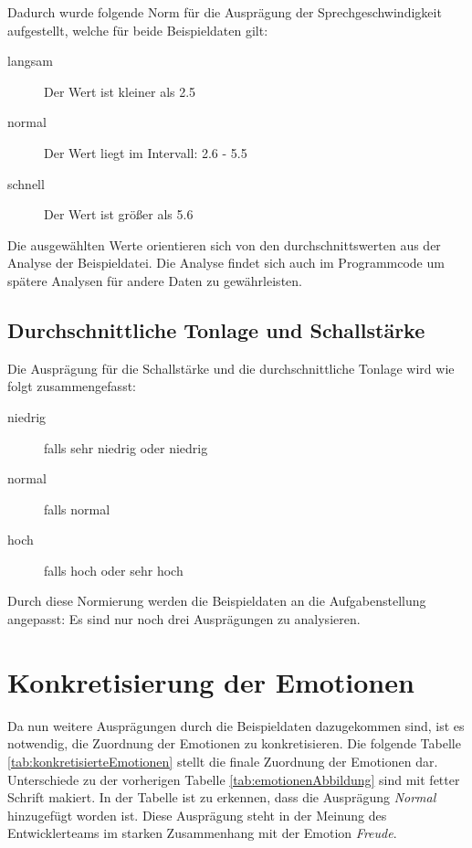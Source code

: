 Dadurch wurde folgende Norm für die Ausprägung der Sprechgeschwindigkeit aufgestellt, welche für beide Beispieldaten gilt:
\begin{description}
  \item [langsam] Der Wert ist kleiner als 2.5
  \item [normal] Der Wert liegt im Intervall: 2.6 - 5.5
  \item [schnell] Der Wert ist größer als 5.6
\end{description}

Die ausgewählten Werte orientieren sich von den durchschnittswerten aus der Analyse der Beispieldatei. Die Analyse findet sich auch im Programmcode um spätere Analysen für andere Daten zu gewährleisten.

\subsection{Durchschnittliche Tonlage und Schallstärke}
Die Ausprägung für die Schallstärke und die durchschnittliche Tonlage wird wie folgt zusammengefasst:
\begin{description}
\item [niedrig] falls sehr niedrig oder niedrig
\item [normal] falls normal
\item [hoch] falls hoch oder sehr hoch
\end{description}
Durch diese Normierung werden die Beispieldaten an die Aufgabenstellung angepasst: Es sind nur noch drei Ausprägungen zu analysieren.

\section{Konkretisierung der Emotionen}
Da nun weitere Ausprägungen durch die Beispieldaten dazugekommen sind, ist es notwendig, die Zuordnung der Emotionen zu konkretisieren. Die folgende Tabelle \ref{tab:konkretisierteEmotionen} stellt die finale Zuordnung der Emotionen dar. Unterschiede zu der vorherigen Tabelle \ref{tab:emotionenAbbildung} sind mit fetter Schrift makiert. In der Tabelle ist zu erkennen, dass die Ausprägung \textit{Normal} hinzugefügt worden ist. Diese Ausprägung steht in der Meinung des Entwicklerteams im starken Zusammenhang mit der Emotion \textit{Freude}. 


